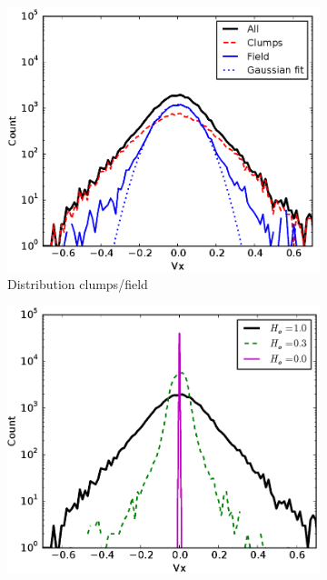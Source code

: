  \begin{figure}
\center
    \centering
    \begin{subfigure}[b]{0.49\textwidth}
    	\centering
    	\includegraphics[width=\textwidth]{Figures/2_Vx_histogram_1}
        \caption{Distribution clumps/field}
        \label{Fig:2_Vx_histogram_1}
    \end{subfigure}
    \begin{subfigure}[b]{0.49\textwidth}
    	\centering
    	\includegraphics[width=\textwidth]{Figures/2_Vx_histogram_2}

\end{subfigure}
\end{figure}
